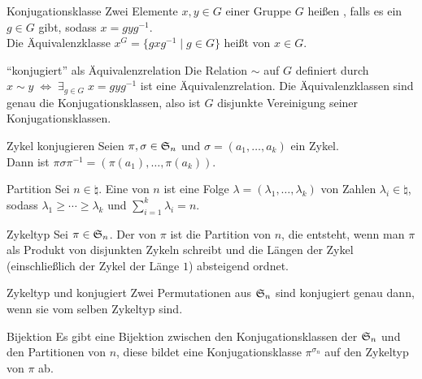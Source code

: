 \begin{Def}{Konjugationsklasse}
    Zwei Elemente $x, y \in G$ einer Gruppe $G$ heißen ,
    falls es ein $g \in G$ gibt, sodass $x = g y g^{-1}$. \\
    Die Äquivalenzklasse $x^G = \{g x g^{-1} \;|\; g \in G\}$ heißt
     von $x \in G$.
\end{Def}

\begin{Lemma}{"`konjugiert"' als Äquivalenzrelation}
    Die Relation $\sim$ auf $G$ definiert durch \\
    $x \sim y \;\Leftrightarrow\; \exists_{g \in G}\; x = g y g^{-1}$
    ist eine Äquivalenzrelation.
    Die Äquivalenzklassen sind genau die Konjugationsklassen,
    also ist $G$ disjunkte Vereinigung seiner Konjugationsklassen.
\end{Lemma}

\begin{Lemma}{Zykel konjugieren}
    Seien $\pi, \sigma \in \mathfrak{S}_n$ und $\sigma = (a_1, \dotsc, a_k)$
    ein Zykel. \\
    Dann ist $\pi \sigma \pi^{-1} = (\pi(a_1), \dotsc, \pi(a_k))$.
\end{Lemma}

\begin{Def}{Partition}
    Sei $n \in \natural$.
    Eine  von $n$ ist eine Folge
    $\lambda = (\lambda_1, \dotsc, \lambda_k)$ von
    Zahlen $\lambda_i \in \natural$, sodass
    $\lambda_1 \ge \dotsb \ge \lambda_k$ und $\sum_{i=1}^k \lambda_i = n$.
\end{Def}

\begin{Def}{Zykeltyp}
    Sei $\pi \in \mathfrak{S}_n$.
    Der  von $\pi$ ist die Partition von $n$, die entsteht,
    wenn man $\pi$ als Produkt von disjunkten Zykeln schreibt und die
    Längen der Zykel (einschließlich der Zykel der Länge $1$)
    absteigend ordnet.
\end{Def}

\begin{Lemma}{Zykeltyp und konjugiert}
    Zwei Permutationen aus $\mathfrak{S}_n$ sind konjugiert genau dann, wenn
    sie vom selben Zykeltyp sind.
\end{Lemma}

\begin{Satz}{Bijektion}
    Es gibt eine Bijektion zwischen den Konjugationsklassen der $\mathfrak{S}_n$
    und den Partitionen von $n$,
    diese bildet eine Konjugationsklasse $\pi^{\sigma_n}$ auf
    den Zykeltyp von $\pi$ ab.
\end{Satz}

